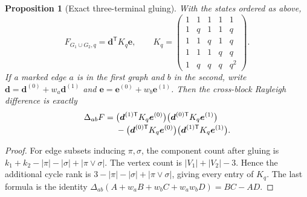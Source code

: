 \documentclass[11pt,a4paper]{article}
\newtheorem{proposition}[theorem]{Proposition}
\theoremstyle{definition}
\theoremstyle{remark}\newtheorem{remark}[theorem]{Remark}
\begin{document}
\begin{proposition}[Exact three-terminal gluing]\label{prop:three-glue}
With the states ordered as above,
\begin{equation}\label{eq:three-K}
 F_{G_1\cup G_2,q}=\boldsymbol d^{\mathsf T}K_q\boldsymbol e,
 \qquad
 K_q=
 \begin{pmatrix}
 1&1&1&1&1\\
 1&q&1&1&q\\
 1&1&q&1&q\\
 1&1&1&q&q\\
 1&q&q&q&q^2
 \end{pmatrix}.
\end{equation}
If a marked edge $a$ is in the first graph and $b$ in the second,
write $\boldsymbol d=\boldsymbol d^{(0)}+w_a\boldsymbol d^{(1)}$
and $\boldsymbol e=\boldsymbol e^{(0)}+w_b\boldsymbol e^{(1)}$.
Then the cross-block Rayleigh difference is exactly
\begin{align}
 \Delta_{ab}F={}&
 \bigl(\boldsymbol d^{(1)\mathsf T}K_q\boldsymbol e^{(0)}\bigr)
 \bigl(\boldsymbol d^{(0)\mathsf T}K_q\boldsymbol e^{(1)}\bigr)
 \notag\\[-2pt]
 &-
 \bigl(\boldsymbol d^{(0)\mathsf T}K_q\boldsymbol e^{(0)}\bigr)
 \bigl(\boldsymbol d^{(1)\mathsf T}K_q\boldsymbol e^{(1)}\bigr).
 \label{eq:three-response-inequality}
\end{align}
\end{proposition}
\begin{proof}
For edge subsets inducing $\pi,\sigma$, the component count after
gluing is $k_1+k_2-|\pi|-|\sigma|+|\pi\vee\sigma|$.
The vertex count is $|V_1|+|V_2|-3$. Hence the additional cycle
rank is $3-|\pi|-|\sigma|+|\pi\vee\sigma|$, giving every entry
of $K_q$. The last formula is the identity
$\Delta_{ab}(A+w_aB+w_bC+w_aw_bD)=BC-AD$.
\end{proof}
\end{document}

